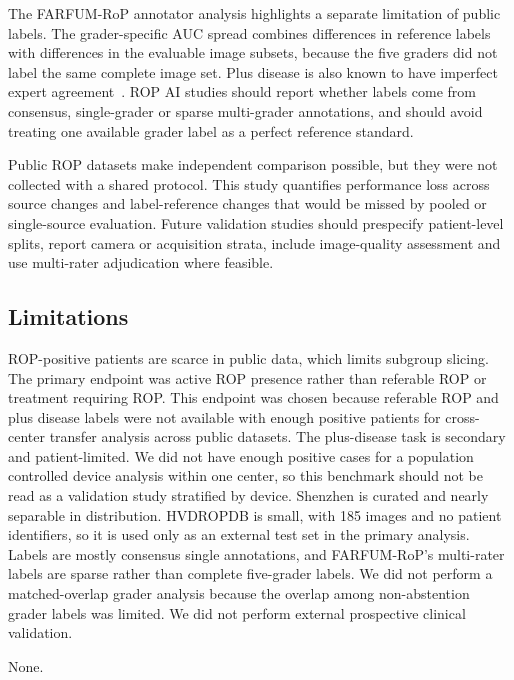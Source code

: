 \documentclass[pdflatex,sn-vancouver,Numbered,iicol]{sn-jnl}
\begin{document}
The FARFUM-RoP annotator analysis highlights a separate limitation of public
labels. The grader-specific AUC spread combines differences in reference labels
with differences in the evaluable image subsets, because the five graders did not
label the same complete image set. Plus disease is also known to have imperfect
expert agreement~\cite{chiang2007}. ROP AI studies should report whether labels
come from consensus, single-grader or sparse multi-grader annotations, and should
avoid treating one available grader label as a perfect reference standard.

Public ROP datasets make independent comparison possible, but they were not
collected with a shared protocol. This study quantifies performance loss across
source changes and label-reference changes that would be missed by pooled or
single-source evaluation. Future validation studies should prespecify
patient-level splits, report camera or acquisition strata, include image-quality
assessment and use multi-rater adjudication where feasible.

\subsection{Limitations}\label{sec:limitations}
ROP-positive patients are scarce in public data, which limits subgroup slicing.
The primary endpoint was active ROP presence rather than referable ROP or
treatment requiring ROP. This endpoint was chosen because referable ROP and plus
disease labels were not available with enough positive patients for cross-center
transfer analysis across public datasets. The plus-disease task is secondary and
patient-limited. We did not have enough positive cases for
a population controlled device analysis within one center, so this benchmark
should not be read as a validation study stratified by device. Shenzhen is curated
and nearly separable in distribution. HVDROPDB is small, with 185 images and no
patient identifiers, so it is used only as an external test set in the primary
analysis. Labels are mostly consensus single annotations, and FARFUM-RoP's
multi-rater labels are sparse rather than complete five-grader labels. We did not
perform a matched-overlap grader analysis because the overlap among non-abstention
grader labels was limited. We did not perform external prospective clinical
validation.

\backmatter

None.

\end{document}
